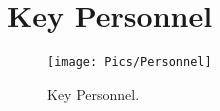 \section{Key Personnel}
\begin{figure}
    \centering
    \texttt{[image: Pics/Personnel]}
    \caption{Key Personnel.}
\end{figure}